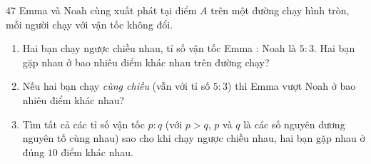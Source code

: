 \begin{probbox}{47}{}
Emma và Noah cùng xuất phát tại điểm $A$ trên một đường chạy hình tròn, mỗi người chạy với vận tốc không đổi.
\begin{enumerate}[label=\alph*),leftmargin=1.6em,itemsep=1pt]
\item Hai bạn chạy ngược chiều nhau, tỉ số vận tốc Emma : Noah là $5:3$. Hai bạn gặp nhau ở bao nhiêu điểm khác nhau trên đường chạy?
\item Nếu hai bạn chạy \emph{cùng chiều} (vẫn với tỉ số $5:3$) thì Emma vượt Noah ở bao nhiêu điểm khác nhau?
\item Tìm tất cả các tỉ số vận tốc $p:q$ (với $p>q$, $p$ và $q$ là các số nguyên dương nguyên tố cùng nhau) sao cho khi chạy ngược chiều nhau, hai bạn gặp nhau ở đúng $10$ điểm khác nhau.
\end{enumerate}
\end{probbox}
